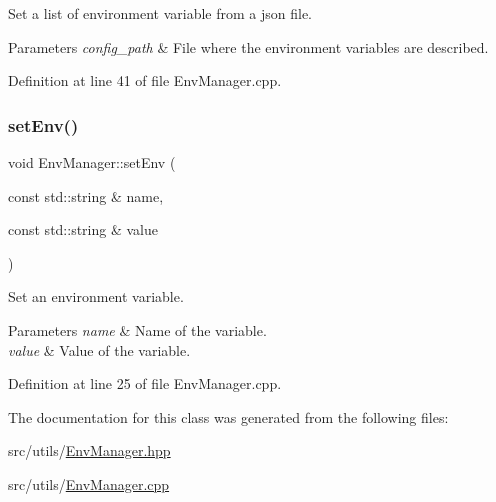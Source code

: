 Set a list of environment variable from a json file. 


\begin{DoxyParams}{Parameters}
{\em config\+\_\+path} & File where the environment variables are described. \\
\hline
\end{DoxyParams}


Definition at line 41 of file Env\+Manager.\+cpp.

\mbox{\label{classtls_1_1_env_manager_a560e9c9885ae4e656eb7121adc4cbc9a}} 
\subsubsection{\texorpdfstring{set\+Env()}{setEnv()}}
{\footnotesize\ttfamily void Env\+Manager\+::set\+Env (\begin{DoxyParamCaption}\item[{const std\+::string \&}]{name,  }\item[{const std\+::string \&}]{value }\end{DoxyParamCaption})\hspace{0.3cm}{\ttfamily [static]}}



Set an environment variable. 


\begin{DoxyParams}{Parameters}
{\em name} & Name of the variable. \\
\hline
{\em value} & Value of the variable. \\
\hline
\end{DoxyParams}


Definition at line 25 of file Env\+Manager.\+cpp.



The documentation for this class was generated from the following files\+:\begin{DoxyCompactItemize}
\item 
src/utils/\hyperlink{_env_manager_8hpp}{Env\+Manager.\+hpp}\item 
src/utils/\hyperlink{_env_manager_8cpp}{Env\+Manager.\+cpp}\end{DoxyCompactItemize}
